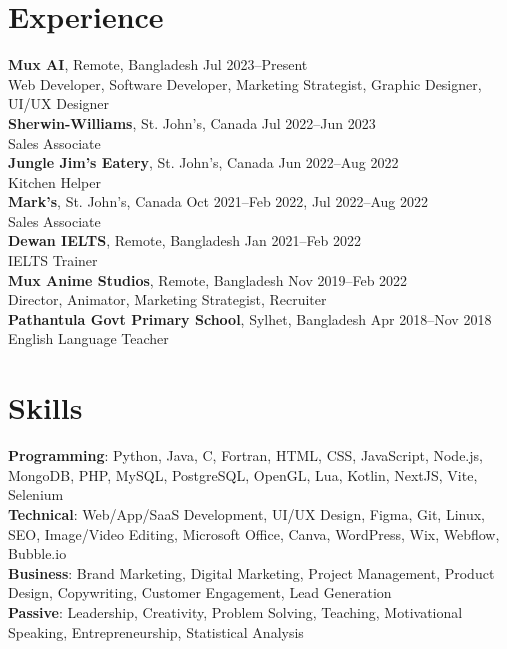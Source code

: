 \documentclass[10pt,letterpaper]{article}
\begin{document}
\section*{Experience}
\textbf{Mux AI}, Remote, Bangladesh \hfill Jul 2023--Present \\
\hspace*{1.5em} Web Developer, Software Developer, Marketing Strategist, Graphic Designer, UI/UX Designer \\
\textbf{Sherwin-Williams}, St. John's, Canada \hfill Jul 2022--Jun 2023 \\
\hspace*{1.5em} Sales Associate \\
\textbf{Jungle Jim's Eatery}, St. John's, Canada \hfill Jun 2022--Aug 2022 \\
\hspace*{1.5em} Kitchen Helper \\
\textbf{Mark's}, St. John's, Canada \hfill Oct 2021--Feb 2022, Jul 2022--Aug 2022 \\
\hspace*{1.5em} Sales Associate \\
\textbf{Dewan IELTS}, Remote, Bangladesh \hfill Jan 2021--Feb 2022 \\
\hspace*{1.5em} IELTS Trainer \\
\textbf{Mux Anime Studios}, Remote, Bangladesh \hfill Nov 2019--Feb 2022 \\
\hspace*{1.5em} Director, Animator, Marketing Strategist, Recruiter \\
\textbf{Pathantula Govt Primary School}, Sylhet, Bangladesh \hfill Apr 2018--Nov 2018 \\
\hspace*{1.5em} English Language Teacher

\section*{Skills}
\textbf{Programming}: Python, Java, C, Fortran, HTML, CSS, JavaScript, Node.js, MongoDB, PHP, MySQL, PostgreSQL, \hspace*{1.5em}OpenGL, Lua, Kotlin, NextJS, Vite, Selenium \\
\textbf{Technical}: Web/App/SaaS Development, UI/UX Design, Figma, Git, Linux, SEO, Image/Video Editing, Microsoft Office, Canva, \hspace*{1.5em}WordPress, Wix, Webflow, Bubble.io \\
\textbf{Business}: Brand Marketing, Digital Marketing, Project Management, Product Design, Copywriting, Customer Engagement, \hspace*{1.5em}Lead Generation \\
\textbf{Passive}: Leadership, Creativity, Problem Solving, Teaching, Motivational Speaking, Entrepreneurship, Statistical Analysis
\end{document}
